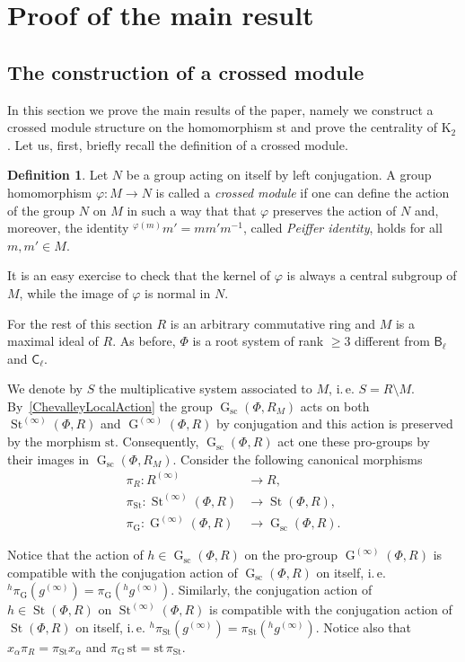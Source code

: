 \documentclass[oneside, 11pt]{amsart}
\numberwithin{equation}{section}
\theoremstyle{definition}
\newtheorem{df}[lemma]{Definition} \Crefname{df}{Definition}{Definitions}
\theoremstyle{remark}
\DeclareMathOperator\St{St}
\DeclareMathOperator\GG{G}
\newcommand{\up}[2]{{^{#1}\!{#2}}}
\newcommand{\rB}{\mathsf{B}}
\newcommand{\rC}{\mathsf{C}}
\begin{document}
\section{Proof of the main result} \label{sec:proof-main}
\subsection{The construction of a crossed module}
In this section we prove the main results of the paper, namely we construct a crossed module structure on the homomorphism $\mathrm{st}$ and prove the centrality of $\mathrm{K}_2$. Let us, first, briefly recall the definition of a crossed module. 

\begin{df} \label{df:crossed-module}
Let $N$ be a group acting on itself by left conjugation.
A group homomorphism $\varphi\colon M \to N$ is called a {\it crossed module} if one can define the action of the group $N$ on $M$ in such a way that that $\varphi$ preserves the action of $N$ and, moreover, the identity ${}^{\varphi(m)}\!m' = m m' m^{-1}$, called {\it Peiffer identity}, holds for all $m, m' \in M$.
\end{df}
It is an easy exercise to check that the kernel of $\varphi$ is always a central subgroup of $M$, while the image of $\varphi$ is normal in $N$.

For the rest of this section $R$ is an arbitrary commutative ring and $M$ is a maximal ideal of $R$.
As before, \(\Phi\) is a root system of rank \(\geq 3\) different from \(\rB_\ell\) and \(\rC_\ell\).

 We denote by $S$ the multiplicative system associated to $M$, i.\,e. $S= R\setminus M$. By~\cref{ChevalleyLocalAction} the group $\GG_{\mathrm{sc}}(\Phi, R_M)$ acts on both $\St^{(\infty)}(\Phi, R)$ and $\GG^{(\infty)}(\Phi, R)$ by conjugation and this action is preserved by the morphism $\mathrm{st}$. Consequently, $\GG_{\mathrm{sc}}(\Phi, R)$ act one these pro-groups by their images in $\GG_\mathrm{sc}(\Phi, R_M) $. Consider the following canonical morphisms 
\begin{align*}
 \pi_R \colon R^{(\infty)} &\to R,\\
 \pi_{\St} \colon \St^{(\infty)}(\Phi, R) &\to \St(\Phi, R),\\
 \pi_{\GG} \colon \GG^{(\infty)}(\Phi, R) &\to \GG_{\mathrm{sc}}(\Phi, R).
\end{align*}

 Notice that the action of $h\in \GG_{\mathrm{sc}}(\Phi, R)$ on the pro-group $\GG^{(\infty)}(\Phi, R)$ is compatible with the conjugation action of $\GG_{\mathrm{sc}}(\Phi, R)$ on itself, i.\,e. $\up{h}\pi_{\GG}(g^{(\infty)}) = \pi_{\GG}(\up{h} {g^{(\infty)}})$.
Similarly, the conjugation action of $h\in \St(\Phi, R)$ on $\St^{(\infty)}(\Phi, R)$ is compatible with the conjugation action of $\St(\Phi, R)$ on itself, i.\,e. $\up{h}\pi_{\St}(g^{(\infty)}) = \pi_{\St}(\up{h}{g^{(\infty)}})$.
Notice also that $x_\alpha \pi_R = \pi_{\St} x_\alpha$ and $\pi_{\GG}\, \mathrm{st} = \mathrm{st}\, \pi_{\St}$.
\end{document}
